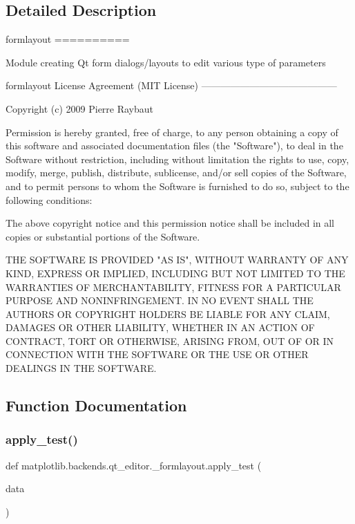 \subsection{Detailed Description}
\begin{DoxyVerb}formlayout
==========

Module creating Qt form dialogs/layouts to edit various type of parameters


formlayout License Agreement (MIT License)
------------------------------------------

Copyright (c) 2009 Pierre Raybaut

Permission is hereby granted, free of charge, to any person
obtaining a copy of this software and associated documentation
files (the "Software"), to deal in the Software without
restriction, including without limitation the rights to use,
copy, modify, merge, publish, distribute, sublicense, and/or sell
copies of the Software, and to permit persons to whom the
Software is furnished to do so, subject to the following
conditions:

The above copyright notice and this permission notice shall be
included in all copies or substantial portions of the Software.

THE SOFTWARE IS PROVIDED "AS IS", WITHOUT WARRANTY OF ANY KIND,
EXPRESS OR IMPLIED, INCLUDING BUT NOT LIMITED TO THE WARRANTIES
OF MERCHANTABILITY, FITNESS FOR A PARTICULAR PURPOSE AND
NONINFRINGEMENT. IN NO EVENT SHALL THE AUTHORS OR COPYRIGHT
HOLDERS BE LIABLE FOR ANY CLAIM, DAMAGES OR OTHER LIABILITY,
WHETHER IN AN ACTION OF CONTRACT, TORT OR OTHERWISE, ARISING
FROM, OUT OF OR IN CONNECTION WITH THE SOFTWARE OR THE USE OR
OTHER DEALINGS IN THE SOFTWARE.
\end{DoxyVerb}
 

\subsection{Function Documentation}
\mbox{\label{namespacematplotlib_1_1backends_1_1qt__editor_1_1__formlayout_a46ecf7c4b58fbb8f3348db15fbd3226c}} 
\subsubsection{\texorpdfstring{apply\+\_\+test()}{apply\_test()}}
{\footnotesize\ttfamily def matplotlib.\+backends.\+qt\+\_\+editor.\+\_\+formlayout.\+apply\+\_\+test (\begin{DoxyParamCaption}\item[{}]{data }\end{DoxyParamCaption})}

